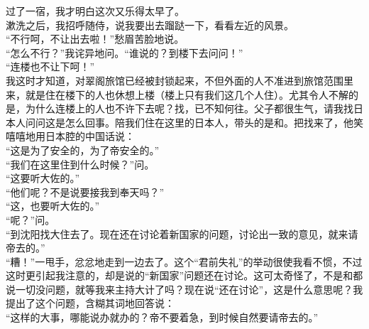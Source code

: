 过了一宿，我才明白这次又乐得太早了。\\

漱洗之后，我招呼随侍，说我要出去蹓跶一下，看看左近的风景。\\

“不行呵，不让出去啦！”愁眉苦脸地说。\\

“怎么不行？”我诧异地问。“谁说的？到楼下去问问！”\\

“连楼也不让下呵！”\\

我这时才知道，对翠阁旅馆已经被封锁起来，不但外面的人不准进到旅馆范围里来，就是住在楼下的人也休想上楼（楼上只有我们这几个人住）。尤其令人不解的是，为什么连楼上的人也不许下去呢？找，已不知何往。父子都很生气，请我找日本人问问这是怎么回事。陪我们住在这里的日本人，带头的是和。把找来了，他笑嘻嘻地用日本腔的中国话说：\\

“这是为了安全的，为了帝安全的。”\\

“我们在这里住到什么时候？”问。\\

“这要听大佐的。”\\

“他们呢？不是说要接我到奉天吗？”\\

“这，也要听大佐的。”\\

“呢？”问。\\

“到沈阳找大住去了。现在还在讨论着新国家的问题，讨论出一致的意见，就来请帝去的。”\\

“糟！”一甩手，忿忿地走到一边去了。这个“君前失礼”的举动很使我看不惯，不过这时更引起我注意的，却是说的“新国家”问题还在讨论。这可太奇怪了，不是和都说一切没问题，就等我来主持大计了吗？现在说“还在讨论”，这是什么意思呢？我提出了这个问题，含糊其词地回答说：\\

“这样的大事，哪能说办就办的？帝不要着急，到时候自然要请帝去的。”\\


